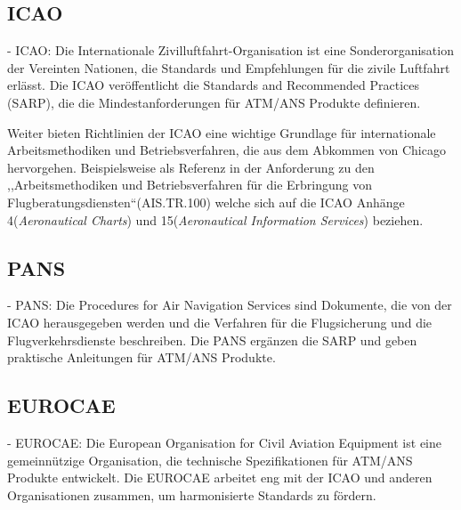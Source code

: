 \subsection{ICAO}
- ICAO: Die Internationale Zivilluftfahrt-Organisation ist eine Sonderorganisation der Vereinten Nationen, die Standards und Empfehlungen für die zivile Luftfahrt erlässt. Die ICAO veröffentlicht die Standards and Recommended Practices (SARP), die die Mindestanforderungen für ATM/ANS Produkte definieren.

Weiter bieten Richtlinien der \ac{ICAO} eine wichtige Grundlage für internationale Arbeitsmethodiken und Betriebsverfahren, die aus dem Abkommen von Chicago hervorgehen.
Beispielsweise als Referenz in der Anforderung zu den ,,Arbeitsmethodiken und Betriebsverfahren für die Erbringung von Flugberatungsdiensten``(\textsf{AIS.TR.100}) welche sich auf die ICAO Anhänge 4(\textit{Aeronautical Charts}) und 15(\textit{Aeronautical Information Services}) beziehen.
\cite[Anh. IV]{2017R0373}

\subsection{PANS}
- PANS: Die Procedures for Air Navigation Services sind Dokumente, die von der ICAO herausgegeben werden und die Verfahren für die Flugsicherung und die Flugverkehrsdienste beschreiben. Die PANS ergänzen die SARP und geben praktische Anleitungen für ATM/ANS Produkte.

\subsection{EUROCAE}
- EUROCAE: Die European Organisation for Civil Aviation Equipment ist eine gemeinnützige Organisation, die technische Spezifikationen für ATM/ANS Produkte entwickelt. Die EUROCAE arbeitet eng mit der ICAO und anderen Organisationen zusammen, um harmonisierte Standards zu fördern.

